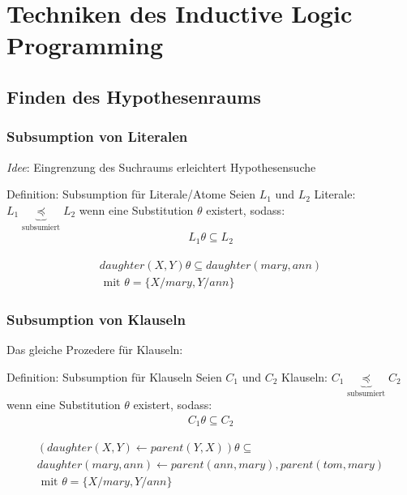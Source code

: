 \section{Techniken des Inductive Logic Programming}
\subsection{Finden des Hypothesenraums}
\begin{frame}
	\frametitle{Subsumption von Literalen}
	\emph{Idee}: Eingrenzung des Suchraums erleichtert Hypothesensuche

	\begin{block}{Definition: Subsumption für Literale/Atome}
		Seien $L_1$ und $L_2$ Literale: $L_1 \underbrace{\preceq}_{\text{subsumiert}} L_2$
		wenn eine Substitution $\theta$ existert, sodass:
		\begin{align*}
			 L_1 \theta \subseteq L_2
		\end{align*}
	\end{block}
	\begin{bsp}
		\begin{align*}
			 daughter(X, Y)\theta\subseteq daughter(mary, ann)\\\text{  mit  } \theta = \{X/mary, Y/ann\}
		\end{align*}
	\end{bsp}
\end{frame}
\begin{frame}
	\frametitle{Subsumption von Klauseln}
	Das gleiche Prozedere für Klauseln:
	\begin{block}{Definition: Subsumption für Klauseln}
		Seien $C_1$ und $C_2$ Klauseln: $C_1 \underbrace{\preceq}_{\text{subsumiert}} C_2$
		wenn eine Substitution $\theta$ existert, sodass:
		\begin{align*}
			 C_1 \theta \subseteq C_2
		\end{align*}
	\end{block}
	\begin{bsp}
		\begin{gather*}
			(daughter(X, Y)\leftarrow parent(Y,X))\theta \subseteq\\
			 daughter(mary, ann) \leftarrow parent(ann, mary), parent(tom, mary)\\
			 \text{  mit  } \theta = \{X/mary, Y/ann\}
		\end{gather*}
	\end{bsp}
\end{frame}

